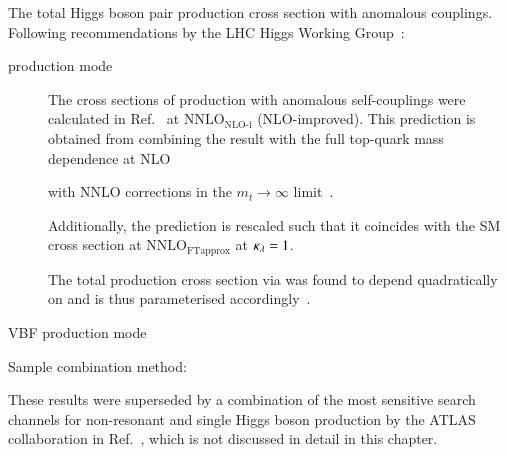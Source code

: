 The total Higgs boson pair production cross section with anomalous
couplings. Following recommendations by the LHC Higgs Working
Group~\cite{LHCHWGHH}:
\begin{description}

\item[\ggF production mode] The cross sections of \HH production with
  anomalous self-couplings were calculated in
  Ref.~\cite{Amoroso:2020lgh} at $\text{NNLO}_{\text{NLO-i}}$
  (NLO-improved). This prediction is obtained from combining the
  result with the full top-quark mass dependence at
  NLO~\cite{Buchalla:2018yce}


  with NNLO corrections in the $m_{t} \to \infty$
  limit~\cite{deFlorian:2017qfk}.

  Additionally, the prediction is rescaled such that it coincides with
  the SM \HH cross section at $\text{NNLO}_{\text{FTapprox}}$ at
  $\kappa_{\lambda} = 1$.

  The total \HH production cross section via \ggF was found to depend
  quadratically on \klambda and is thus parameterised
  accordingly~\cite{LHCHWGHH}.

\item[VBF production mode]

\end{description}



Sample combination method:~\cite{ATL-PHYS-PUB-2019-007}



These results were superseded by a combination of the most sensitive
search channels for non-resonant \HH and single Higgs boson production
by the ATLAS collaboration in Ref.~\cite{ATLAS-CONF-2022-050}, which
is not discussed in detail in this chapter.


